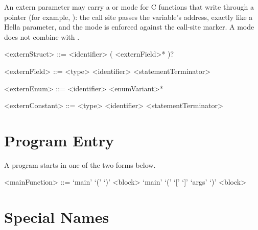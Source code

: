 \documentclass[makeidx]{article}
\begin{document}
\LMHash{}%
An extern parameter may carry a  or  mode for C
functions that write through a pointer (for example,
): the call site passes the variable's
address, exactly like a Hella  parameter, and the mode is
enforced against the call-site marker. A mode does not combine with
.


\begin{grammar}
<externStruct> ::= \STRUCT{} <identifier>
  \gnewline{} (\HAS{} <externField>* \END{})?

<externField> ::= <type> <identifier> <statementTerminator>

<externEnum> ::= \ENUM{} <identifier> \HAS{} <enumVariant>* \END{}

<externConstant> ::= \CONST{} <type> <identifier> <statementTerminator>
\end{grammar}

\section{Program Entry}

\LMHash{}%
A program starts in one of the two  forms below.

\begin{grammar}
<mainFunction> ::= \VOID{} `main' `(' `)' <block>
  \alt \INT{} `main' `('  `[' `]' `args' `)' <block>
\end{grammar}


\section{Special Names}
\end{document}
